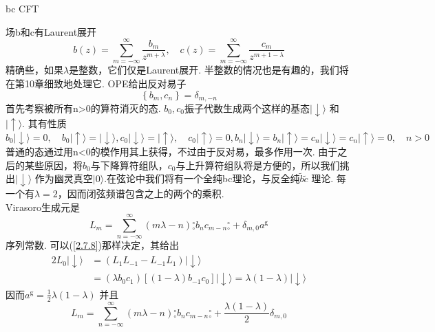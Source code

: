 \centerline{\Large bc CFT}
场b和c有Laurent展开
\begin{equation}
b(z)=\sum_{m=-\infty}^{\infty} \frac{b_{m}}{z^{m+\lambda}}, \quad c(z)=\sum_{m=-\infty}^{\infty} \frac{c_{m}}{z^{m+1-\lambda}}
\end{equation}
精确些，如果$\lambda$是整数，它们仅是Laurent展开. 半整数的情况也是有趣的，我们将在第10章细致地处理它. OPE给出反对易子
\begin{equation}
\left\{b_{m}, c_{n}\right\}=\delta_{m,-n}
\end{equation}
首先考察被所有n>0的算符消灭的态. $b_0, c_0$振子代数生成两个这样的基态$|\downarrow\rangle$ 和 $|\uparrow\rangle$. 其有性质
\begin{subequations}
\begin{equation}
b_{0}|\downarrow\rangle=0, \quad b_{0}|\uparrow\rangle=|\downarrow\rangle,
\end{equation}
\begin{equation}
c_{0}|\downarrow\rangle=|\uparrow\rangle, \quad c_{0}|\uparrow\rangle=0,
\end{equation}
\begin{equation}
b_{n}|\downarrow\rangle=b_{n}|\uparrow\rangle=c_{n}|\downarrow\rangle=c_{n}|\uparrow\rangle=0, \quad n>0
\end{equation}
\end{subequations}
普通的态通过用n<0的模作用其上获得，不过由于反对易，最多作用一次. 由于之后的某些原因，将$b_0$与下降算符组队，$c_0$与上升算符组队将是方便的，所以我们挑出$|\downarrow\rangle$ 作为幽灵真空$|0\rangle$.在弦论中我们将有一个全纯bc理论，与反全纯$\tilde{b} \tilde{c}$ 理论. 每一个有$\lambda=2$，因而闭弦频谱包含之上的两个的乘积.\\
Virasoro生成元是
\begin{equation}
L_{m}=\sum_{n=-\infty}^{\infty}(m \lambda-n) {}_\circ^\circ b_{n} c_{m-n}{}_\circ^\circ+\delta_{m, 0} a^{\mathrm{g}}
\end{equation}
序列常数. 可以(\ref{2.7.8})那样决定，其给出
\begin{equation}
\begin{aligned}
2 L_{0}|\downarrow\rangle &=\left(L_{1} L_{-1}-L_{-1} L_{1}\right)|\downarrow\rangle \\
&=\left(\lambda b_{0} c_{1}\right)\left[(1-\lambda) b_{-1} c_{0}\right]|\downarrow\rangle=\lambda(1-\lambda)|\downarrow\rangle
\end{aligned}
\end{equation}
因而$a^{\mathrm{g}}=\frac{1}{2} \lambda(1-\lambda)$
并且
\begin{equation}
L_{m}=\sum_{n=-\infty}^{\infty}(m \lambda-n) {}_\circ^\circ b_{n} c_{m-n}{}_\circ^\circ+\frac{\lambda(1-\lambda)}{2} \delta_{m, 0}
\end{equation}
